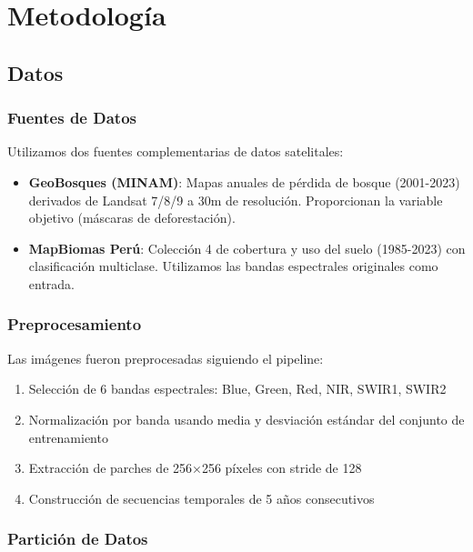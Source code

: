 \documentclass[conference]{IEEEtran}
\begin{document}
\section{Metodología}

\subsection{Datos}

\subsubsection{Fuentes de Datos}

Utilizamos dos fuentes complementarias de datos satelitales:

\begin{itemize}
    \item \textbf{GeoBosques (MINAM)}: Mapas anuales de pérdida de bosque (2001-2023) derivados de Landsat 7/8/9 a 30m de resolución. Proporcionan la variable objetivo (máscaras de deforestación).

    \item \textbf{MapBiomas Perú}: Colección 4 de cobertura y uso del suelo (1985-2023) con clasificación multiclase. Utilizamos las bandas espectrales originales como entrada.
\end{itemize}

\subsubsection{Preprocesamiento}

Las imágenes fueron preprocesadas siguiendo el pipeline:

\begin{enumerate}
    \item Selección de 6 bandas espectrales: Blue, Green, Red, NIR, SWIR1, SWIR2
    \item Normalización por banda usando media y desviación estándar del conjunto de entrenamiento
    \item Extracción de parches de 256×256 píxeles con stride de 128
    \item Construcción de secuencias temporales de 5 años consecutivos
\end{enumerate}

\subsubsection{Partición de Datos}
\end{document}
